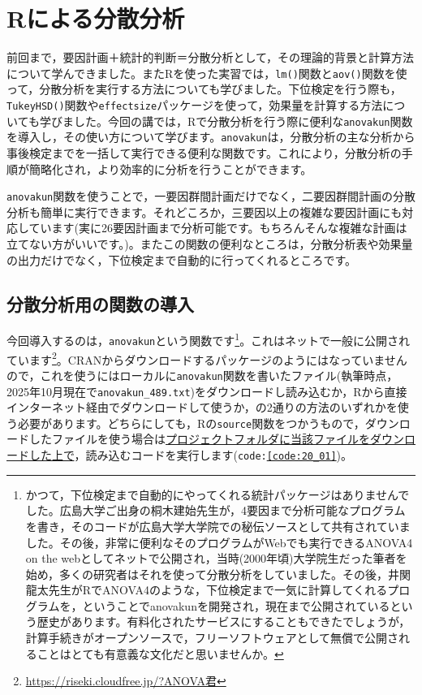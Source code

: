 \documentclass{ltjbook}
\begin{document}
\chapter{Rによる分散分析}
\label{ch20_BetweenDesign_onR}

前回まで，要因計画＋統計的判断＝分散分析として，その理論的背景と計算方法について学んできました。またRを使った実習では，\verb|lm()|関数と\verb|aov()|関数を使って，分散分析を実行する方法についても学びました。下位検定を行う際も，\verb|TukeyHSD()|関数や\verb|effectsize|パッケージを使って，効果量を計算する方法についても学びました。今回の講では，Rで分散分析を行う際に便利な\verb|anovakun|関数を導入し，その使い方について学びます。\verb|anovakun|は，分散分析の主な分析から事後検定までを一括して実行できる便利な関数です。これにより，分散分析の手順が簡略化され，より効率的に分析を行うことができます。

\verb|anovakun|関数を使うことで，一要因群間計画だけでなく，二要因群間計画の分散分析も簡単に実行できます。それどころか，三要因以上の複雑な要因計画にも対応しています(実に26要因計画まで分析可能です。もちろんそんな複雑な計画は立てない方がいいです。)。またこの関数の便利なところは，分散分析表や効果量の出力だけでなく，下位検定まで自動的に行ってくれるところです。

\section{分散分析用の関数の導入}

今回導入するのは，\verb|anovakun|という関数です\footnote{かつて，下位検定まで自動的にやってくれる統計パッケージはありませんでした。広島大学ご出身の桐木建始先生が，4要因まで分析可能なプログラムを書き，そのコードが広島大学大学院での秘伝ソースとして共有されていました。その後，非常に便利なそのプログラムがWebでも実行できるANOVA4 on the webとしてネットで公開され，当時(2000年頃)大学院生だった筆者を始め，多くの研究者はそれを使って分散分析をしていました。その後，井関龍太先生がRでANOVA4のような，下位検定まで一気に計算してくれるプログラムを，ということでanovakunを開発され，現在まで公開されているという歴史があります。有料化されたサービスにすることもできたでしょうが，計算手続きがオープンソースで，フリーソフトウェアとして無償で公開されることはとても有意義な文化だと思いませんか。}。これはネットで一般に公開されています\footnote{\url{https://riseki.cloudfree.jp/?ANOVA君}}。CRANからダウンロードするパッケージのようにはなっていませんので，これを使うにはローカルに\texttt{anovakun}関数を書いたファイル(執筆時点，2025年10月現在で\verb|anovakun_489.txt|)をダウンロードし読み込むか，Rから直接インターネット経由でダウンロードして使うか，の2通りの方法のいずれかを使う必要があります。どちらにしても，Rの\texttt{source}関数をつかうもので，ダウンロードしたファイルを使う場合は\underline{プロジェクトフォルダに当該ファイルをダウンロードした上で}，読み込むコードを実行します(\texttt{code:\ref{code:20_01}})。
\end{document}
